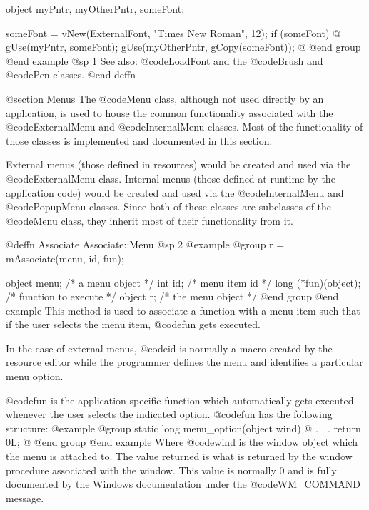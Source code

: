 object  myPntr, myOtherPntr, someFont;

someFont = vNew(ExternalFont, "Times New Roman", 12);
if (someFont)  @{
        gUse(myPntr, someFont);
        gUse(myOtherPntr, gCopy(someFont));
@}
@end group
@end example
@sp 1
See also:  @code{LoadFont} and the @code{Brush} and @code{Pen} classes.
@end deffn










@section Menus
The @code{Menu} class, although not used directly by an application, is
used to house the common functionality associated with the
@code{ExternalMenu} and @code{InternalMenu} classes.  Most of the
functionality of those classes is implemented and documented in this
section.

External menus (those defined in resources) would be created and used
via the @code{ExternalMenu} class.  Internal menus (those defined at runtime
by the application code) would be created and used via the
@code{InternalMenu} and @code{PopupMenu} classes.  Since both of these
classes are subclasses of the @code{Menu} class, they inherit most of
their functionality from it.







@deffn {Associate} Associate::Menu
@sp 2
@example
@group
r = mAssociate(menu, id, fun);

object  menu;   /*  a menu object     */
int     id;     /*  menu item id      */
long    (*fun)(object);  /*  function to execute  */
object  r;      /*  the menu object   */
@end group
@end example
This method is used to associate a function with a menu item such that if
the user selects the menu item, @code{fun} gets executed.

In the case of external menus, @code{id} is normally a macro created by
the resource editor while the programmer defines the menu and identifies
a particular menu option.

@code{fun} is the application specific function which automatically gets
executed whenever the user selects the indicated option.  @code{fun} has
the following structure:
@example
@group
static  long    menu_option(object wind)
@{
           .
           .
           .
        return 0L;
@}
@end group
@end example
Where @code{wind} is the window object which the menu is attached to.
The value returned is what is returned by the window procedure associated
with the window.  This value is normally 0 and is fully documented by
the Windows documentation under the @code{WM_COMMAND} message.

